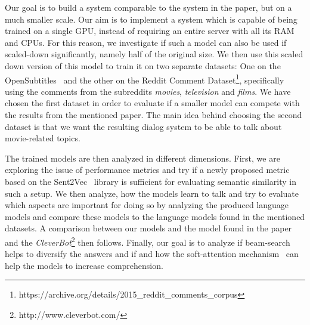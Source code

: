 Our goal is to build a system comparable to the system in the paper, but on a much smaller scale. Our aim is to implement a system which is capable of being trained on a single GPU, instead of requiring an entire server with all its RAM and CPUs. For this reason, we investigate if such a model can also be used if scaled-down significantly, namely half of the original size. We then use this scaled down version of this model to train it on two separate datasets: One on the OpenSubtitles~\cite{Lison:2016} and the other on the Reddit Comment Dataset\footnote{https://archive.org/details/2015\_reddit\_comments\_corpus}, specifically using the comments from the subreddits \emph{movies}, \emph{television} and \emph{films}. We have chosen the first dataset in order to evaluate if a smaller model can compete with the results from the mentioned paper. The main idea behind choosing the second dataset is that we want the resulting dialog system to be able to talk about movie-related topics.

The trained models are then analyzed in different dimensions. First, we are exploring the issue of performance metrics and try if a newly proposed metric based on the Sent2Vec~\cite{Pgj:2017} library is sufficient for evaluating semantic similarity in such a setup. We then analyze, how the models learn to talk and try to evaluate which aspects are important for doing so by analyzing the produced language models and compare these models to the language models found in the mentioned datasets. A comparison between our models and the model found in the paper and the \emph{CleverBot}\footnote{http://www.cleverbot.com/} then follows. Finally, our goal is to analyze if beam-search helps to diversify the answers and if and how the soft-attention mechanism~\cite{Bahdanau:2014} can help the models to increase comprehension.
